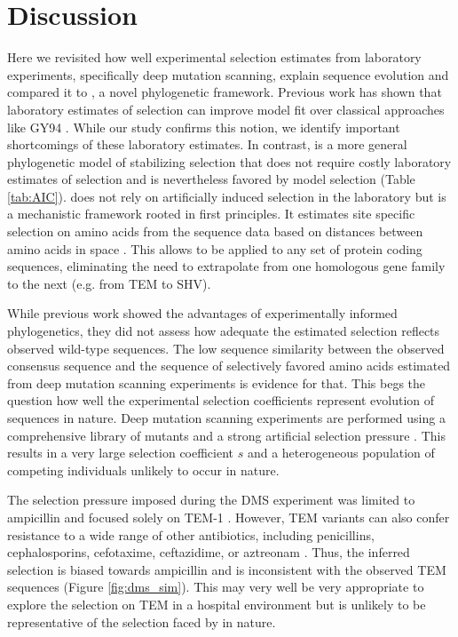 \section{Discussion}

Here we revisited how well experimental selection estimates from laboratory experiments, specifically deep mutation scanning, explain sequence evolution and compared it to \selac, a novel phylogenetic framework.
Previous work has shown that laboratory estimates of selection can improve model fit over classical approaches like GY94 \citep{bloom2014, bloom2017}.
While our study confirms this notion, we identify important shortcomings of these laboratory estimates.
In contrast, \selac is a more general phylogenetic model of stabilizing selection that does not require costly laboratory estimates of selection and is nevertheless favored by model selection (Table \ref{tab:AIC}).
\selac does not rely on artificially induced selection in the laboratory but is a mechanistic framework rooted in first principles.
It estimates site specific selection on amino acids from the sequence data based on distances between amino acids in \PC space \citep{grantham1974,beaulieu2018}.
This allows \selac to be applied to any set of protein coding sequences, eliminating the need to extrapolate from one homologous gene family to the next (e.g. from TEM to SHV).

While previous work showed the advantages of experimentally informed phylogenetics, they did not assess how adequate the estimated selection reflects observed wild-type sequences.
The low sequence similarity between the observed consensus sequence and the sequence of selectively favored amino acids estimated from deep mutation scanning experiments is evidence for that.
This begs the question how well the experimental selection coefficients represent evolution of sequences in nature.
Deep mutation scanning experiments are performed using a comprehensive library of mutants and a strong artificial selection pressure \citep{FirnbergAndOstermeier2012, Jain2014, FowlerAndFields2014, Fowler2014}.
This results in a very large selection coefficient $s$ and a heterogeneous population of competing individuals unlikely to occur in nature.

The selection pressure imposed during the DMS experiment was limited to ampicillin and focused solely on TEM-1 \citep{stiffler2016}.
However, TEM variants can also confer resistance to a wide range of other antibiotics, including penicillins, cephalosporins, cefotaxime, ceftazidime, or aztreonam \citep{sougakoff1988,sougakoff1989,goussard1991,mabilat1992,chanal1992,brun1994}.
Thus, the inferred selection is biased towards ampicillin and is inconsistent with the observed TEM sequences (Figure \ref{fig:dms_sim}).
This may very well be very appropriate to explore the selection on TEM in a hospital environment but is unlikely to be representative of the selection faced by \ecoli in nature.

